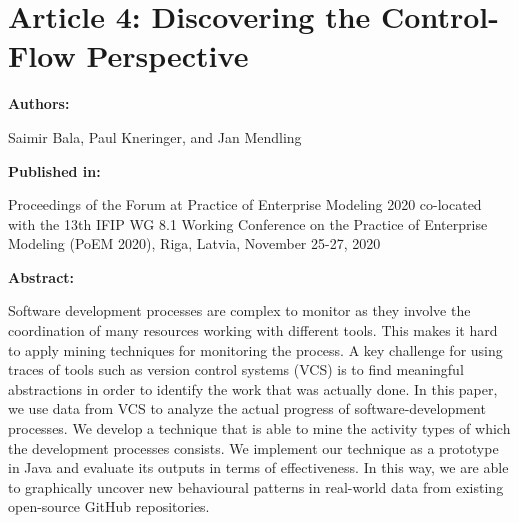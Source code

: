 \chapter{Article 4: Discovering the Control-Flow Perspective}
\label{chap:project-mining2}

{\bfseries \Large Authors: \medskip}

Saimir Bala,
Paul Kneringer, and
Jan Mendling \hfill

\bigskip

{\noindent\bfseries \Large Published in: \medskip}

Proceedings of the Forum at Practice of Enterprise Modeling 2020 co-located
with the 13th {IFIP} {WG} 8.1 Working Conference on the Practice of
Enterprise Modeling (PoEM 2020), Riga, Latvia, November 25-27, 2020

\bigskip

{\noindent\bfseries \Large Abstract: \medskip}


Software development processes are complex to monitor as they involve the coordination of many resources working with different tools.
This makes it hard to apply mining techniques for monitoring the process. 
A key challenge for using traces of tools such as version control systems (VCS) is to find meaningful abstractions in order to identify the work that was actually done. 
In this paper, we use data from VCS to analyze the actual progress of software-development processes. We develop a technique that is able to mine the activity types of which the development processes consists. 
We implement our technique as a prototype in Java and evaluate its outputs in terms of effectiveness.
In this way, we are able to graphically uncover new behavioural patterns in real-world data from existing open-source GitHub repositories.

\pagebreak


%

%





